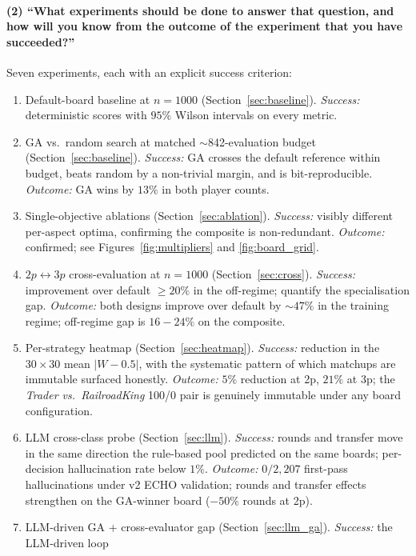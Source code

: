 \documentclass[10pt]{article}
\begin{document}
\paragraph{(2) ``What experiments should be done to answer that
question, and how will you know from the outcome of the experiment
that you have succeeded?''}
Seven experiments, each with an explicit success criterion:
\begin{enumerate}[leftmargin=1.4em,itemsep=1pt]
\item Default-board baseline at $n{=}1000$
(Section~\ref{sec:baseline}). \emph{Success:} deterministic scores
with $95\%$ Wilson intervals on every metric.
\item GA vs.\ random search at matched $\sim$842-evaluation budget
(Section~\ref{sec:baseline}). \emph{Success:} GA crosses the
default reference within budget, beats random by a non-trivial
margin, and is bit-reproducible. \emph{Outcome:} GA wins by $13\%$
in both player counts.
\item Single-objective ablations (Section~\ref{sec:ablation}).
\emph{Success:} visibly different per-aspect optima, confirming the
composite is non-redundant. \emph{Outcome:} confirmed; see
Figures~\ref{fig:multipliers} and \ref{fig:board_grid}.
\item $2p\!\leftrightarrow\!3p$ cross-evaluation at $n{=}1000$
(Section~\ref{sec:cross}). \emph{Success:} improvement over default
$\geq 20\%$ in the off-regime; quantify the specialisation gap.
\emph{Outcome:} both designs improve over default by $\sim 47\%$ in
the training regime; off-regime gap is $16\!-\!24\%$ on the
composite.
\item Per-strategy heatmap (Section~\ref{sec:heatmap}).
\emph{Success:} reduction in the $30\times 30$ mean $|W-0.5|$, with
the systematic pattern of which matchups are immutable surfaced
honestly. \emph{Outcome:} $5\%$ reduction at 2p, $21\%$ at 3p; the
\textsl{Trader vs.\ RailroadKing} 100/0 pair is genuinely
immutable under any board configuration.
\item LLM cross-class probe (Section~\ref{sec:llm}). \emph{Success:}
rounds and transfer move in the same direction the rule-based pool
predicted on the same boards; per-decision hallucination rate below
$1\%$. \emph{Outcome:} $0/2{,}207$ first-pass hallucinations under
v2 ECHO validation; rounds and transfer effects strengthen on the
GA-winner board ($-50\%$ rounds at 2p).
\item LLM-driven GA + cross-evaluator gap
(Section~\ref{sec:llm_ga}). \emph{Success:} the LLM-driven loop

\end{enumerate}
\end{document}

